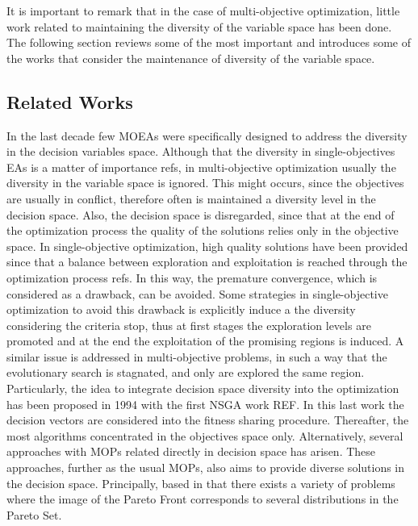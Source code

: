It is important to remark that in the case of multi-objective optimization, little work related to maintaining the 
diversity of the variable space has been done.
%
The following section reviews some of the most important \MOEAS{} and introduces some of the works that consider
the maintenance of diversity of the variable space.


\subsection{Related Works}

In the last decade few MOEAs were specifically designed to address the diversity in the decision variables space.
%
Although that the diversity in single-objectives EAs is a matter of importance refs, in multi-objective optimization usually the diversity in the variable space is ignored.
%
This might occurs, since the objectives are usually in conflict, therefore often is maintained a diversity level in the decision space.
%
Also, the decision space is disregarded, since that at the end of the optimization process the quality of the solutions relies only in the objective space.
%
In single-objective optimization, high quality solutions have been provided since that a balance between exploration and exploitation is reached through the optimization process refs.
%
In this way, the premature convergence, which is considered as a drawback, can be avoided.
%
Some strategies in single-objective optimization to avoid this drawback is explicitly induce a the diversity considering the criteria stop, thus at first stages the exploration levels are promoted and at the end the exploitation of the promising regions is induced.
%
A similar issue is addressed in multi-objective problems, in such a way that the evolutionary search is stagnated, and only are explored the same region.
%
Particularly, the idea to integrate decision space diversity into the optimization has been proposed in 1994 with the first NSGA work REF.
%
In this last work the decision vectors are considered into the fitness sharing procedure.
%
Thereafter, the most algorithms concentrated in the objectives space only.
%
Alternatively, several approaches with MOPs related directly in decision space has arisen.
%
These approaches, further as the usual MOPs, also aims to provide diverse solutions in the decision space.
%
Principally, based in that there exists a variety of problems where the image of the Pareto Front corresponds to several distributions in the Pareto Set.
%


